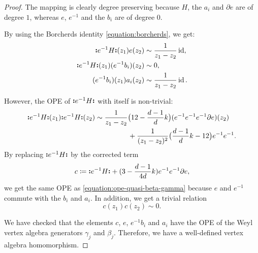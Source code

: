 \begin{proof}
	The mapping is clearly degree preserving because $H$, the $a_i$ and $\partial e$ are of degree $1$, whereas $e$, $e^{-1}$ and the $b_i$ are of degree $0$.
	
	By using the Borcherds identity \eqref{equation:borcherds}, we get:
	\begin{equation} \label{equation:ope-quasi-beta-gamma} \begin{aligned}
		\mathopen{\boldsymbol{\vcentcolon}}e^{-1} H\mathclose{\boldsymbol{\vcentcolon}}(z_1) e(z_2) & \sim \frac{1}{z_1 - z_2} \operatorname{id}, \\ 
		\mathopen{\boldsymbol{\vcentcolon}}e^{-1} H\mathclose{\boldsymbol{\vcentcolon}}(z_1) (e^{-1} b_i)(z_2) & \sim 0, \\
		(e^{-1} b_i) (z_1) a_i(z_2) & \sim \frac{1}{z_1 - z_2} \operatorname{id}.
	\end{aligned} \end{equation}
	
	However, the OPE of $\mathopen{\boldsymbol{\vcentcolon}}e^{-1}H\mathclose{\boldsymbol{\vcentcolon}}$ with itself is non-trivial:
	\[ \begin{multlined}
		\NO{e^{-1}H}(z_1) \NO{e^{-1}H}(z_2) \sim \frac{1}{z_1 - z_2} \big(12 - \frac{d-1}{d} k \big) (e^{-1} e^{-1} e^{-1} \partial e)(z_2) \\
		 + \frac{1}{(z_1 - z_2)^2} \big(\frac{d-1}{d} k - 12\big) e^{-1} e^{-1}.
	\end{multlined} \]
	By replacing $\mathopen{\boldsymbol{\vcentcolon}}e^{-1}H\mathclose{\boldsymbol{\vcentcolon}}$ by the corrected term 
	\[ c \coloneqq  \mathopen{\boldsymbol{\vcentcolon}}e^{-1}H\mathclose{\boldsymbol{\vcentcolon}} + (3 - \frac{d - 1}{4 d} k) e^{-1} e^{-1} \partial e, \]
	we get the same OPE as \eqref{equation:ope-quasi-beta-gamma} because $e$ and $e^{-1}$ commute with the $b_i$ and $a_i$. In addition, we get a trivial relation 
	\[ c(z_1) c(z_2) \sim 0. \]
	
	We have checked that the elements $c$, $e$, $e^{-1} b_i$ and $a_i$ have the OPE of the Weyl vertex algebra generators $\gamma_j$ and $\beta_j$. Therefore, we have a well-defined vertex algebra homomorphism.  
	

\end{proof}
